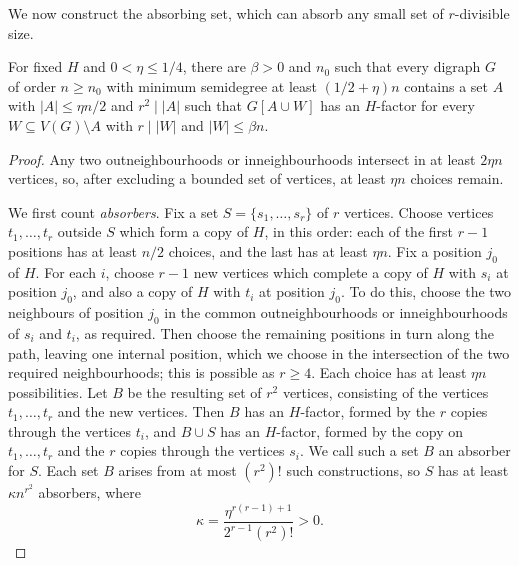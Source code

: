 We now construct the absorbing set, which can absorb any small set of $r$-divisible size.

\begin{lemma}\label{general:absorb}
For fixed $H$ and $0<\eta\le1/4$, there are $\beta>0$ and $n_0$ such
that every digraph $G$ of order $n\ge n_0$ with minimum semidegree
at least $(1/2+\eta)n$ contains a set $A$ with $|A|\le\eta n/2$ and $r^2\mid|A|$ such that $G[A\cup W]$ has an
$H$-factor for every $W\subseteq V(G)\setminus A$ with
$r\mid|W|$ and $|W|\le\beta n$.
\end{lemma}
\begin{proof}
Any two outneighbourhoods or inneighbourhoods intersect in at least
$2\eta n$ vertices, so, after excluding a bounded set of vertices, at least $\eta n$ choices remain.

We first count \emph{absorbers}. Fix a set $S=\{s_1,\ldots,s_r\}$ of $r$ vertices.
Choose vertices $t_1,\ldots,t_r$ outside $S$ which form a copy of $H$, in this order:
each of the first $r-1$ positions has at least $n/2$ choices,
and the last has at least $\eta n$.
Fix a position $j_0$ of $H$. For each $i$, choose $r-1$ new vertices which complete a copy of $H$ with $s_i$ at position $j_0$, and also a copy of $H$ with $t_i$ at position $j_0$. To do this, choose the two neighbours of position $j_0$ in the common outneighbourhoods or inneighbourhoods of $s_i$ and $t_i$, as required. Then choose the remaining positions in turn along the path, leaving one
internal position, which we choose in the intersection of the two required neighbourhoods; this is possible as $r\ge4$.
Each choice has at least $\eta n$ possibilities.
Let $B$ be the resulting set of $r^2$ vertices, consisting of the vertices $t_1,\ldots,t_r$ and the new vertices. Then $B$ has an $H$-factor, formed by the $r$ copies through the vertices $t_i$, and
$B\cup S$ has an $H$-factor, formed by the copy on $t_1,\ldots,t_r$ and the $r$ copies through the vertices $s_i$. We call such a set $B$ an absorber for $S$.
Each set $B$ arises from at most $(r^2)!$ such constructions, so $S$ has at least $\kappa n^{r^2}$ absorbers, where
\[
 \kappa=\frac{\eta^{r(r-1)+1}}{2^{r-1}(r^2)!}>0.
\]


\end{proof}
